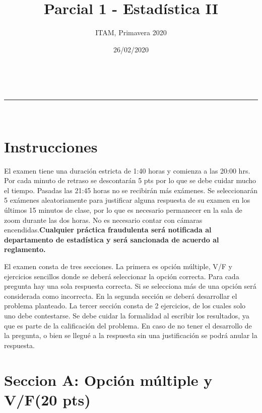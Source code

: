 \documentclass[addpoints]{exam}
\makeatletter
\newcommand{\linia}{\rule{\linewidth}{0.5pt}}
\theoremstyle{mytheor}
\renewcommand{\maketitle}{
    \begin{center}
    \vspace{2ex}
    {\huge \textsc{\@title}}
    \vspace{1ex}
    \\
    \linia\\
    \@author \hfill \@date
    \vspace{4ex}
    \end{center}
  }
\makeatother
\begin{document}
  
  \title{Parcial 1 - Estadística II}
  
  \author{ITAM, Primavera 2020}
  
  \date{26/02/2020}
  
  \maketitle
  
  \section*{Instrucciones}
  
El examen tiene una duración estricta de 1:40 horas y comienza a las 20:00 hrs. Por cada minuto de retraso se descontarán 5 pts por lo que se debe cuidar mucho el tiempo. Pasadas las 21:45 horas no se recibirán más exámenes. Se seleccionarán 5 exámenes aleatoriamente para justificar alguna respuesta de su examen en los últimos 15 minutos de clase, por lo que es necesario permanecer en la sala de zoom durante las dos horas. No es necesario contar con cámaras encendidas.\textbf{Cualquier práctica fraudulenta será notificada al departamento de estadística y será sancionada de acuerdo al reglamento.} 

El examen consta de tres secciones. La primera es opción múltiple, V/F y ejercicios sencillos donde se deberá seleccionar la opción correcta. Para cada pregunta hay una sola respuesta correcta. Si se selecciona más de una opción será considerada como incorrecta. En la segunda sección se deberá desarrollar el problema planteado. La tercer sección consta de 2 ejercicios, de los cuales solo uno debe contestarse. Se debe cuidar la formalidad al escribir los resultados, ya que es parte de la calificación del problema. En caso de no tener el desarrollo de la pregunta, o bien se llegué a la respuesta sin una justificación se podrá anular la respuesta.  

\vspace{10pt}
  

  
  \section*{Seccion A: Opción múltiple y V/F(20 pts)}
  
\end{document}
